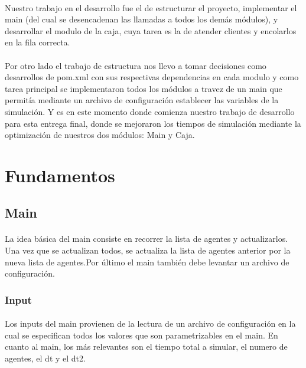 \documentclass{article}
\begin{document}
\paragraph{}
Nuestro trabajo en el desarrollo fue el de estructurar el proyecto, implementar el main (del cual se desencadenan las llamadas a todos los demás módulos),  y desarrollar el modulo de la caja, cuya tarea es la  de atender clientes y encolarlos en la fila correcta.

\paragraph{}
Por otro lado el trabajo de estructura nos llevo a tomar decisiones como desarrollos de pom.xml con sus respectivas dependencias en cada modulo y como tarea principal se implementaron todos los módulos a travez de un main que permitía mediante un archivo de configuración establecer las variables de la simulación. Y es en este momento donde comienza nuestro trabajo de desarrollo para esta entrega final, donde se mejoraron los tiempos de simulación mediante la optimización de nuestros dos módulos: Main y Caja.

\section{Fundamentos}

\subsection{Main}

\paragraph{}
La idea básica del main consiste en recorrer la lista de agentes y actualizarlos. Una vez que se actualizan todos, se actualiza la lista de agentes anterior por la nueva lista de agentes.Por último el main también debe levantar un archivo de configuración.

\subsubsection{Input}

\paragraph{}

Los inputs del main provienen de la lectura de un archivo de configuración en la cual se especifican todos los valores que son parametrizables en el main. En cuanto al main, los más relevantes son el tiempo total a simular, el numero de agentes, el dt  y el dt2.
\end{document}
